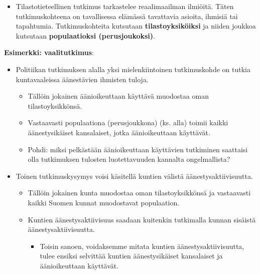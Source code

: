 \documentclass[
]{book}
\providecommand{\tightlist}{%
  \setlength{\itemsep}{0pt}\setlength{\parskip}{0pt}}
\begin{document}
\begin{itemize}
\tightlist
\item
  Tilastotieteellinen tutkimus tarkastelee reaalimaailman ilmiöitä. Täten tutkimuskohteena on tavallisessa elämässä tavattavia asioita, ihmisiä tai tapahtumia. Tutkimuskohteita kutsutaan \textbf{tilastoyksiköiksi} ja niiden joukkoa kutsutaan \textbf{populaatioksi (perusjoukoksi)}.
\end{itemize}

\begin{eblock}{}

\textbf{Esimerkki: vaalitutkimus}:

\begin{itemize}
\tightlist
\item
  Politiikan tutkimuksen alalla yksi mielenkiintoinen tutkimuskohde on tutkia kuntavaaleissa äänestävien ihmisten tuloja.

  \begin{itemize}
  \tightlist
  \item
    Tällöin jokainen äänioikeuttaan käyttävä muodostaa oman tilastoyksikkönsä.
  \item
    Vastaavasti populaationa (perusjoukkona) (ks. alla) toimii kaikki äänestysikäiset kansalaiset, jotka äänioikeuttaan käyttävät.
  \item
    Pohdi: miksi pelkästään äänioikeuttaan käyttävien tutkiminen saattaisi olla tutkimuksen tulosten luotettavuuden kannalta ongelmallista?
  \end{itemize}
\item
  Toinen tutkimuskysymys voisi käsitellä kuntien välistä äänestysaktiivisuutta.

  \begin{itemize}
  \tightlist
  \item
    Tällöin jokainen kunta muodostaa oman tilastoyksikkönsä ja vastaavasti kaikki Suomen kunnat muodostavat populaation.
  \item
    Kuntien äänestysaktiivisuus saadaan kuitenkin tutkimalla kunnan sisäistä äänestysaktiivisuutta.

    \begin{itemize}
    \tightlist
    \item
      Toisin sanoen, voidaksemme mitata kuntien äänestysaktiivisuutta, tulee ensiksi selvittää kuntien äänestysikäiset kansalaiset ja äänioikeuttaan käyttävät.
    \end{itemize}
  \end{itemize}
\end{itemize}

\end{eblock}
\end{document}
